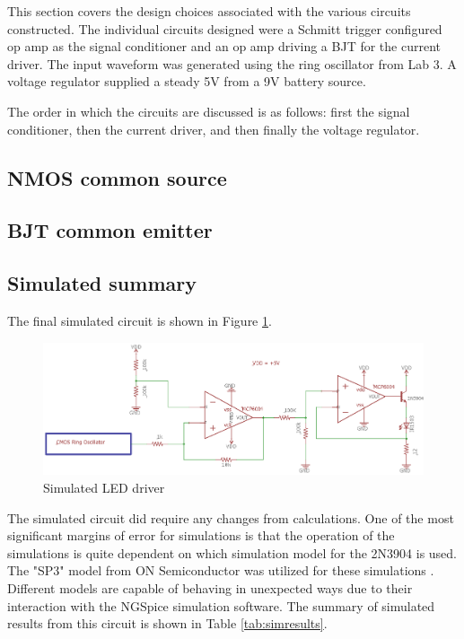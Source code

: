 



This section covers the design choices associated with the various circuits constructed. The individual circuits designed were a Schmitt trigger configured op amp as the signal conditioner and an op amp driving a BJT for the current driver. The input waveform was generated using the ring oscillator from Lab 3. A voltage regulator supplied a steady 5V from a 9V battery source.

The order in which the circuits are discussed is as follows: first the signal conditioner, then the current driver, and then finally the voltage regulator.


\subsection{NMOS common source}


\subsection{BJT common emitter}




\subsection{Simulated summary}
The final simulated circuit is shown in Figure \ref{fig:finalschemlab4}.

\begin{figure}[H]
	\centering
	\includegraphics[width=0.75\linewidth]{CircuitDevelopment/FinalschemLab4}
	\caption[Simulated circuit]{Simulated LED driver}
	\label{fig:finalschemlab4}
\end{figure}
The simulated circuit did require any changes from calculations. One of the most significant margins of error for simulations is that the operation of the simulations is quite dependent on which simulation model for the 2N3904 is used. The "SP3" model from ON Semiconductor was utilized for these simulations \cite{spice}. Different models are capable of behaving in unexpected ways due to their interaction with the NGSpice simulation software. The summary of simulated results from this circuit is shown in Table \ref{tab:simresults}.

